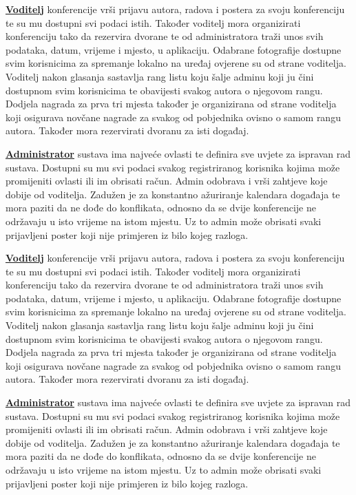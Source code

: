 		\textbf{\underline{Voditelj}} konferencije vrši prijavu autora, radova i postera za svoju konferenciju te su mu dostupni svi podaci istih. Također voditelj mora organizirati konferenciju tako da rezervira dvorane te od administratora traži unos svih podataka, datum, vrijeme i mjesto, u aplikaciju. Odabrane fotografije dostupne svim korisnicima za spremanje lokalno na uređaj ovjerene su od strane voditelja. Voditelj nakon glasanja sastavlja rang listu koju šalje adminu koji ju čini dostupnom svim korisnicima te obavijesti svakog autora o njegovom rangu. Dodjela nagrada za prva tri mjesta također je organizirana od strane voditelja koji osigurava novčane nagrade za svakog od pobjednika ovisno o samom rangu autora. Također mora rezervirati dvoranu za isti događaj.
		
		\textbf{\underline{Administrator}} sustava ima najveće ovlasti te definira sve uvjete za ispravan rad sustava. Dostupni su mu svi podaci svakog registriranog korisnika kojima može promijeniti ovlasti ili im obrisati račun. Admin odobrava i vrši zahtjeve koje dobije od voditelja. Zadužen je za konstantno ažuriranje kalendara događaja te mora paziti da ne dođe do konflikata, odnosno da se dvije konferencije ne održavaju u isto vrijeme na istom mjestu. Uz to admin može obrisati svaki prijavljeni poster koji nije primjeren iz bilo kojeg razloga.

		\textbf{\underline{Voditelj}} konferencije vrši prijavu autora, radova i postera za svoju konferenciju te su mu dostupni svi podaci istih. Također voditelj mora organizirati konferenciju tako da rezervira dvorane te od administratora traži unos svih podataka, datum, vrijeme i mjesto, u aplikaciju. Odabrane fotografije dostupne svim korisnicima za spremanje lokalno na uređaj ovjerene su od strane voditelja. Voditelj nakon glasanja sastavlja rang listu koju šalje adminu koji ju čini dostupnom svim korisnicima te obavijesti svakog autora o njegovom rangu. Dodjela nagrada za prva tri mjesta također je organizirana od strane voditelja koji osigurava novčane nagrade za svakog od pobjednika ovisno o samom rangu autora. Također mora rezervirati dvoranu za isti događaj.

		\textbf{\underline{Administrator}} sustava ima najveće ovlasti te definira sve uvjete za ispravan rad sustava. Dostupni su mu svi podaci svakog registriranog korisnika kojima može promijeniti ovlasti ili im obrisati račun. Admin odobrava i vrši zahtjeve koje dobije od voditelja. Zadužen je za konstantno ažuriranje kalendara događaja te mora paziti da ne dođe do konflikata, odnosno da se dvije konferencije ne održavaju u isto vrijeme na istom mjestu. Uz to admin može obrisati svaki prijavljeni poster koji nije primjeren iz bilo kojeg razloga.
		

				

		
	